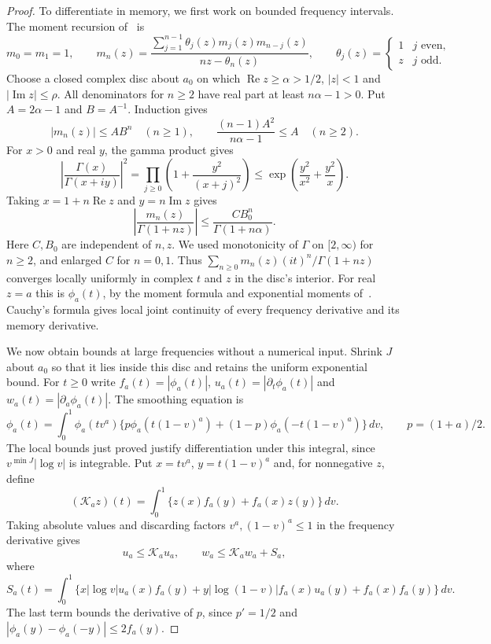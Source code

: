 \begin{proof}
To differentiate in memory, we first work on bounded frequency intervals.
The moment recursion of~\cite[Theorem~1.4]{glr2026} is
\[
 m_0=m_1=1,\qquad
 m_n(z)=\frac{\sum_{j=1}^{n-1}\theta_j(z)m_j(z)m_{n-j}(z)}
                   {nz-\theta_n(z)},\qquad
 \theta_j(z)=\begin{cases}1&j\text{ even},\\z&j\text{ odd}.
                  \end{cases}
\]
Choose a closed complex disc about $a_0$ on which
$\operatorname{Re}z\ge\alpha>1/2$, $|z|<1$ and
$|\operatorname{Im}z|\le\rho$. All denominators for $n\ge2$ have
real part at least $n\alpha-1>0$.
Put $A=2\alpha-1$ and $B=A^{-1}$. Induction gives
\[
 |m_n(z)|\le AB^n\quad(n\ge1),\qquad
 \frac{(n-1)A^2}{n\alpha-1}\le A\quad(n\ge2).
\]
For $x>0$ and real $y$, the gamma product gives
\[
 \left|\frac{\Gamma(x)}{\Gamma(x+iy)}\right|^2
 =\prod_{j\ge0}\left(1+\frac{y^2}{(x+j)^2}\right)
 \le\exp\left(\frac{y^2}{x^2}+\frac{y^2}{x}\right).
\]
Taking $x=1+n\operatorname{Re}z$ and $y=n\operatorname{Im}z$ gives
\[
 \left|\frac{m_n(z)}{\Gamma(1+nz)}\right|
 \le\frac{C B_0^n}{\Gamma(1+n\alpha)}.
\]
Here $C,B_0$ are independent of $n,z$. We used monotonicity of
$\Gamma$ on $[2,\infty)$ for $n\ge2$, and enlarged $C$ for $n=0,1$.
Thus $\sum_{n\ge0}m_n(z)(it)^n/\Gamma(1+nz)$ converges locally
uniformly in complex $t$ and $z$ in the disc's interior.
For real $z=a$ this is $\phi_a(t)$, by the moment formula and
exponential moments of~\cite[Corollary~2.11]{glr2026}.
Cauchy's formula gives local joint continuity of every frequency
derivative and its memory derivative.

We now obtain bounds at large frequencies without a numerical input.
Shrink $J$ about $a_0$ so that it lies inside this disc and retains the
uniform exponential bound. For $t\ge0$ write
$f_a(t)=|\phi_a(t)|$, $u_a(t)=|\partial_t\phi_a(t)|$ and
$w_a(t)=|\partial_a\phi_a(t)|$. The smoothing equation is
\[
 \phi_a(t)=\int_0^1\phi_a(tv^a)
 \{p\phi_a(t(1-v)^a)+(1-p)\phi_a(-t(1-v)^a)\}\,dv,
 \qquad p=(1+a)/2.
\]
The local bounds just proved justify differentiation under this integral,
since $v^{\min J}|\log v|$ is integrable. Put $x=tv^a$,
$y=t(1-v)^a$ and, for nonnegative $z$, define
\[
 (\mathcal K_a z)(t)=\int_0^1\{z(x)f_a(y)+f_a(x)z(y)\}\,dv.
\]
Taking absolute values and discarding factors $v^a,(1-v)^a\le1$
in the frequency derivative gives
\[
 u_a\le\mathcal K_a u_a,\qquad
 w_a\le\mathcal K_a w_a+S_a,
\]
where
\[
 S_a(t)=\int_0^1\{x|\log v|u_a(x)f_a(y)
       +y|\log(1-v)|f_a(x)u_a(y)+f_a(x)f_a(y)\}\,dv.
\]
The last term bounds the derivative of $p$, since $p'=1/2$ and
$|\phi_a(y)-\phi_a(-y)|\le2f_a(y)$.


\end{proof}
